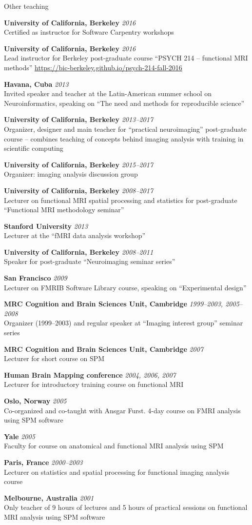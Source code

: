 \documentclass{cv}
\newcommand{\PlaceDateNote}[3]{{\bf #1} \hfill {\em #2} \\#3}
\newcommand{\UCB}{University of California, Berkeley}
\newcommand{\CBU}{MRC Cognition and Brain Sciences Unit, Cambridge}
\begin{document}
\begin{cvSection}{Other teaching}

\PlaceDateNote{\UCB}{2016}
    {Certified as instructor for Software Carpentry workshops}

\PlaceDateNote{\UCB}{2016}
{Lead instructor for Berkeley post-graduate course ``PSYCH 214 -- functional
MRI methods'' \url{https://bic-berkeley.github.io/psych-214-fall-2016}}

\PlaceDateNote{Havana, Cuba}{2013}
{Invited speaker and teacher at the Latin-American summer school on
Neuroinformatics, speaking on ``The need and methods for reproducible
science''}

\PlaceDateNote{\UCB}{2013--2017}
{Organizer, designer and main teacher for ``practical neuroimaging''
post-graduate course -- combines teaching of concepts behind imaging analysis
with training in scientific computing}

\PlaceDateNote{\UCB}{2015--2017}
{Organizer: imaging analysis discussion group}

\PlaceDateNote{\UCB}{2008--2017}
{Lecturer on functional MRI spatial processing and statistics for
post-graduate ``Functional MRI methodology seminar''}

\PlaceDateNote{Stanford University}{2013}
{Lecturer at the ``fMRI data analysis workshop''}

\PlaceDateNote{\UCB}{2008--2011}
{Speaker for post-graduate ``Neuroimaging seminar series''}

\PlaceDateNote{San Francisco}{2009}
{Lecturer on FMRIB Software Library course, speaking on ``Experimental
design''}

\PlaceDateNote{\CBU}{1999--2003, 2005--2008}
{Organizer (1999--2003) and regular speaker at ``Imaging interest group''
seminar series}

\PlaceDateNote{\CBU}{2007}
{Lecturer for short course on SPM}

\PlaceDateNote{Human Brain Mapping conference}{2004, 2006, 2007}
{Lecturer for introductory training course on functional MRI}

\PlaceDateNote{Oslo, Norway}{2005}
{Co-organized and co-taught with Ansgar Furst. 4-day course on FMRI analysis
using SPM software}

\PlaceDateNote{Yale}{2005}
{Faculty for course on anatomical and functional MRI analysis using SPM}

\PlaceDateNote{Paris, France}{2000--2003}
{Lecturer on statistics and spatial processing for functional imaging analysis
course}

\PlaceDateNote{Melbourne, Australia}{2001}
{Only teacher of 9 hours of lectures and 5 hours of practical sessions on
functional MRI analysis using SPM software}

\end{cvSection}
\end{document}
